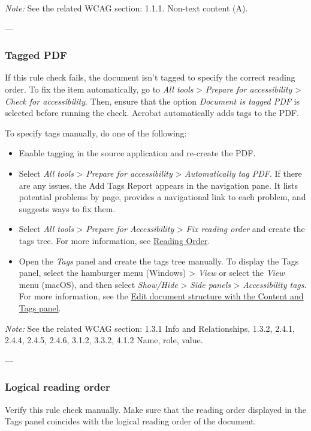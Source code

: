 \vspace{0.5em}
\noindent\textit{Note:} See the related WCAG section: 1.1.1. Non-text content (A)\cite{WCAG}.

---

\subsubsection{Tagged PDF}
If this rule check fails, the document isn't tagged to specify the correct reading order\cite{AdobeHelpX}.
To fix the item automatically, go to \emph{All tools} > \emph{Prepare for accessibility} > \emph{Check for accessibility}. Then, ensure that the option \emph{Document is tagged PDF} is selected before running the check. Acrobat automatically adds tags to the PDF.

To specify tags manually, do one of the following:
\begin{itemize}
    \item Enable tagging in the source application and re-create the PDF.
    \item Select \emph{All tools} > \emph{Prepare for accessibility} > \emph{Automatically tag PDF}. If there are any issues, the Add Tags Report appears in the navigation pane. It lists potential problems by page, provides a navigational link to each problem, and suggests ways to fix them.
    \item Select \emph{All tools} > \emph{Prepare for Accessibility} > \emph{Fix reading order} and create the tags tree. For more information, see \hyperref[sec:reading-order]{Reading Order}.
    \item Open the \emph{Tags} panel and create the tags tree manually. To display the Tags panel, select the hamburger menu (Windows) > \emph{View} or select the \emph{View} menu (macOS), and then select \emph{Show/Hide} > \emph{Side panels} > \emph{Accessibility tags}. For more information, see the \hyperref[sec:edit-structure]{Edit document structure with the Content and Tags panel}.
\end{itemize}

\vspace{0.5em}
\noindent\textit{Note:} See the related WCAG section: 1.3.1 Info and Relationships, 1.3.2, 2.4.1, 2.4.4, 2.4.5, 2.4.6, 3.1.2, 3.3.2, 4.1.2 Name, role, value\cite{WCAG}.

---

\subsubsection{Logical reading order}
Verify this rule check manually. Make sure that the reading order displayed in the Tags panel coincides with the logical reading order of the document\cite{AdobeHelpX}.

